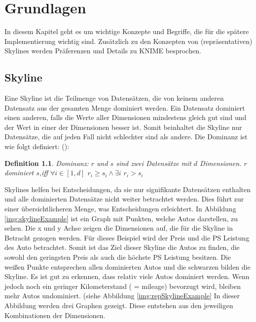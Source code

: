 \newtheorem{Def}{Definition}[chapter]
\chapter{Grundlagen}
\label{ch:Grundlagen} 
In diesem Kapitel geht es um wichtige Konzepte und Begriffe, die für die spätere Implementierung wichtig sind. Zusätzlich zu den Konzepten von (repräsentativen) Skylines werden Präferenzen und Details zu KNIME besprochen.
\section{Skyline}
\label{ch:Grundlagen:sec:skyline}
Eine Skyline ist die Teilmenge von Datensätzen, die von keinem anderen Datensatz aus der gesamten Menge dominiert werden. Ein Datensatz dominiert einen anderen, falls die Werte aller Dimensionen mindestens gleich gut sind und der Wert in einer der Dimensionen besser ist. Somit beinhaltet die Skyline nur Datensätze, die auf jeden Fall nicht schlechter sind als andere. Die Dominanz ist wie folgt definiert: (\cite[p. 3]{magnani2014taking}):

\begin{Def}
Dominanz: $r$ und $s$ sind zwei Datensätze mit $d$ Dimensionen. $r$ dominiert $s$,iff $\forall{i} \in{[1,d]}$ $r_i \geq s_i \land \exists{i}$ $r_i > s_i$
\end{Def}

Skylines helfen bei Entscheidungen, da sie nur signifikante Datensätzen enthalten und alle dominierten Datensätze nicht weiter betrachtet werden. Dies führt zur einer übersichtlicheren Menge, was Entscheidungen erleichtert.
In Abbildung \ref{img:skylineExample} ist ein Graph mit Punkten, welche Autos darstellen, zu sehen. Die x und y Achse zeigen die Dimensionen auf, die für die Skyline in Betracht gezogen werden. Für dieses Beispiel wird der Preis und die PS Leistung des Auto betrachtet. Somit ist das Ziel dieser Skyline die Autos zu finden, die sowohl den geringsten Preis als auch die höchste PS Leistung besitzen.
Die weißen Punkte entsprechen allen dominierten Autos und die schwarzen bilden die Skyline. Es ist gut zu erkennen, dass relativ viele Autos dominiert werden. Wenn jedoch noch ein geringer Kilometerstand ( = mileage) bevorzugt wird, bleiben mehr Autos undominiert. (siehe Abbildung \ref{img:repSkylineExample} In dieser Abbildung werden drei Graphen gezeigt. Diese entstehen aus den jeweiligen Kombinationen der Dimensionen.

